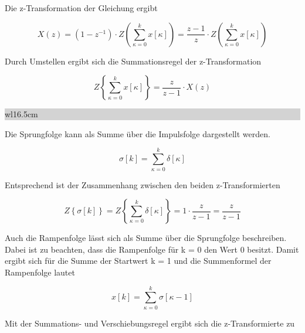 \noindent Die z-Transformation der Gleichung ergibt

\begin{equation}\label{eq:fivesixtytwo}
X\left(z\right)=\left(1-z^{-1} \right)\cdot Z\left(\sum _{\kappa =0}^{k}x\left[\kappa \right] \right)=\frac{z-1}{z} \cdot Z\left(\sum _{\kappa =0}^{k}x\left[\kappa \right] \right)
\end{equation}

\noindent Durch Umstellen ergibt sich die Summationsregel der z-Transformation

\begin{equation}\label{eq:fivesixtythree}
Z\left\{\sum _{\kappa =0}^{k}x\left[\kappa \right] \right\}=\frac{z}{z-1} \cdot X(z)
\end{equation}

\noindent
\colorbox{lightgray}{%
%
\renewcommand\arraystretch{0.6}%
\begin{tabular}{ wl{16.5cm} }
{\selectfont{Beispiel: Summation}}
\end{tabular}%
}\medskip

\noindent Die Sprungfolge kann als Summe \"{u}ber die Impulsfolge dargestellt werden.

\begin{equation}\label{eq:fivesixtyfour}
\sigma \left[k\right]=\sum _{\kappa =0}^{k}\delta \left[\kappa \right]
\end{equation}

\noindent Entsprechend ist der Zusammenhang zwischen den beiden z-Transformierten

\begin{equation}\label{eq:fivesixtyfive}
Z\left\{\sigma \left[k\right]\right\}=Z\left\{\sum _{\kappa =0}^{k}\delta \left[\kappa \right] \right\}=1\cdot \frac{z}{z-1} =\frac{z}{z-1}
\end{equation}

\noindent Auch die Rampenfolge l\"{a}sst sich als Summe \"{u}ber die Sprungfolge beschreiben. Dabei ist zu beachten, dass die Rampenfolge f\"{u}r k = 0 den Wert 0 besitzt. Damit ergibt sich f\"{u}r die Summe der Startwert k = 1 und die Summenformel der Rampenfolge lautet

\begin{equation}\label{eq:fivesixtysix}
x\left[k\right]=\sum _{\kappa =0}^{k}\sigma \left[\kappa -1\right]
\end{equation}

\noindent Mit der Summations- und Verschiebungsregel ergibt sich die z-Transformierte zu

